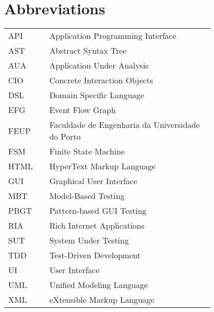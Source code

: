 \chapter*{Abbreviations}

\begin{flushleft}
\begin{tabular}{l p{0.8\linewidth}}
API	 & Application Programming Interface \\
AST	 & Abstract Syntax Tree \\
AUA	 & Application Under Analysis \\
CIO	 & Concrete Interaction Objects \\
DSL	 & Domain Specific Language \\
EFG	 & Event Flow Graph \\
FEUP & Faculdade de Engenharia da Universidade do Porto \\
FSM	 & Finite State Machine \\
HTML & HyperText Markup Language \\
GUI	 & Graphical User Interface \\
MBT	 & Model-Based Testing \\
PBGT & Pattern-based GUI Testing \\
RIA	 & Rich Internet Applications \\
SUT	 & System Under Testing \\
TDD	 & Test-Driven Development \\
UI	 & User Interface \\
UML	 & Unified Modeling Language \\
XML	 & eXtensible Markup Language \\
\end{tabular}
\end{flushleft}